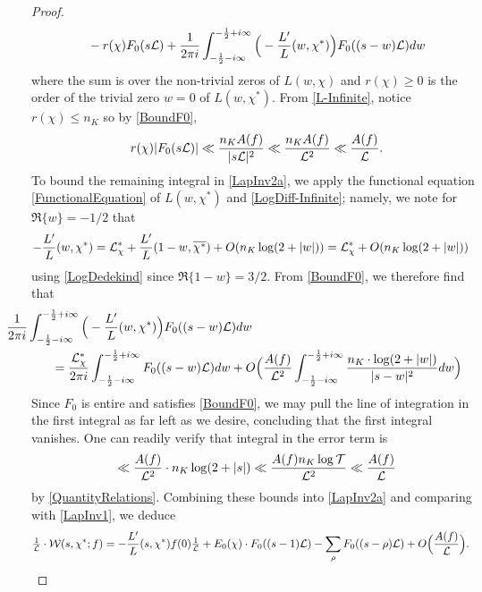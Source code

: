 \documentclass[12pt,psamsfonts]{amsart}
\theoremstyle{definition}
\theoremstyle{remark}
\numberwithin{equation}{section}
\begin{document}
\begin{proof}
\begin{equation}
\begin{aligned}
& \quad - r(\chi) F_0(s\mathcal{L}) + \frac{1}{2\pi i} \int_{-\frac{1}{2} -i\infty}^{-\frac{1}{2}+i\infty} \Big( -\frac{L'}{L}(w, \chi^*) \Big) F_0((s-w)\mathcal{L}) dw 
\end{aligned}
\label{LapInv2a}
\end{equation}
where the sum is over the non-trivial zeros of $L(w,\chi)$ and $r(\chi) \geq 0$ is the order of the trivial zero $w=0$ of $L(w,\chi^*)$. From \eqref{L-Infinite}, notice $r(\chi) \leq n_K$ so by \eqref{BoundF0},
\[
r(\chi) |F_0(s\mathcal{L})| \ll \frac{n_K A(f)}{|s \mathcal{L}|^2} \ll  \frac{n_K A(f)}{\mathcal{L}^2} \ll \frac{A(f)}{\mathcal{L}}.
\]
To bound the remaining integral in \eqref{LapInv2a}, we apply the functional equation \eqref{FunctionalEquation} of $L(w,\chi^*)$ and \cref{LogDiff-Infinite}; namely, we note for $\Re\{w\} = -1/2$ that
\begin{align*}
-\frac{L'}{L}(w,\chi^*) & =  \mathcal{L}_{\chi}^* + \frac{L'}{L}(1-w, \overline{\chi^*}) + O( n_K \log(2 + |w|) ) = \mathcal{L}_{\chi}^* + O(n_K \log(2+|w|))
\end{align*}
using \cref{LogDedekind} since $\Re\{1-w\} = 3/2$. From \eqref{BoundF0}, we therefore find that
\begin{align*}
& \hspace*{-0.5in} \frac{1}{2\pi i} \int_{-\frac{1}{2} -i\infty}^{-\frac{1}{2}+i\infty} \Big( -\frac{L'}{L}(w, \chi^*) \Big) F_0((s-w)\cL) dw \\
&  = \frac{\cL_{\chi}^*}{2\pi i}\int_{-\frac{1}{2} -i\infty}^{-\frac{1}{2}+i\infty} F_0((s-w)\cL) dw + O\Big( \frac{A(f)}{\cL^2}  \int_{-\frac{1}{2} -i\infty}^{-\frac{1}{2}+i\infty}  \frac{n_K \cdot \log(2+|w|)}{|s-w|^2}  dw \Big)
\end{align*}
Since $F_0$ is entire and satisfies \eqref{BoundF0}, we may pull the line of integration in the first integral as far left as we desire, concluding that the first integral vanishes. One can readily verify that integral in the error term is  
\[
\ll \frac{A(f)}{\mathcal{L}^2} \cdot n_K \log(2+|s|) \ll \frac{A(f) n_K \log \mathcal{T}}{\mathcal{L}^2} \ll  \frac{A(f)}{\mathcal{L}}
\]
by \cref{QuantityRelations}. Combining these bounds into \eqref{LapInv2a} and comparing with \eqref{LapInv1}, we deduce
\begin{equation}
\begin{aligned}
\tfrac{1}{\mathcal{L}} \cdot \mathcal{W}(s,\chi^*; f) & = -\frac{L'}{L}(s,\chi^*) f(0) \tfrac{1}{\mathcal{L}} + E_0(\chi)  \cdot F_0((s-1)\mathcal{L})  
 -  \sum_{\rho} F_0((s-\rho)\mathcal{L}) + O\Big( \frac{A(f)}{\mathcal{L}}   \Big). 
\end{aligned}
\label{LapInv2b}
\end{equation}

\end{proof}
\end{document}
